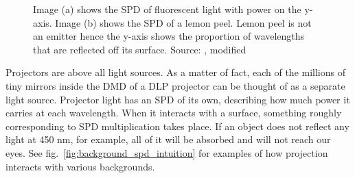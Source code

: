 \begin{figure}
    \centering
    \begin{subfigure}[b]{0.49\textwidth}
        \centering
        \def\svgwidth{\textwidth}
        
        \caption{}
    \end{subfigure}
    \hfill
    \begin{subfigure}[b]{0.49\textwidth}
        \centering
        \def\svgwidth{\textwidth}
        
        \caption{}
    \end{subfigure}
    \caption{Image (a) shows the SPD of fluorescent light with power on the y-axis. Image (b) shows the SPD of a lemon peel. Lemon peel is not an emitter hence the y-axis shows the proportion of wavelengths that are reflected off its surface. Source: \citet{PBRT3e}, modified}
    \label{fig:background_spd}
\end{figure}

Projectors are above all light sources. As a matter of fact, each of the millions of tiny mirrors inside the DMD of a DLP projector can be thought of as a separate light source. Projector light has an SPD of its own, describing how much power it carries at each wavelength. When it interacts with a surface, something roughly corresponding to SPD multiplication takes place. If an object does not reflect any light at 450 nm, for example, all of it will be absorbed and will not reach our eyes. See fig.~\ref{fig:background_spd_intuition} for examples of how projection interacts with various backgrounds.

